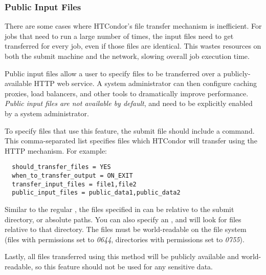 \subsubsection{\label{sec:public-input-files}Public Input Files}
There are some cases where HTCondor's file transfer mechanism is inefficient.
For jobs that need to run a large number of times, the input files need to get 
transferred for every job, even if those files are identical. This wastes 
resources on both the submit machine and the network, slowing overall job 
execution time.

Public input files allow a user to specify files to be transferred over a 
publicly-available HTTP web service. A system administrator can then configure
caching proxies, load balancers, and other tools to dramatically improve 
performance. \emph{Public input files are not available by default}, and need to 
be explicitly enabled by a system administrator.

To specify files that use this feature, the submit file should include a
 command. This comma-separated list specifies
files which HTCondor will transfer using the HTTP mechanism. For example:

\begin{verbatim}
  should_transfer_files = YES
  when_to_transfer_output = ON_EXIT
  transfer_input_files = file1,file2 
  public_input_files = public_data1,public_data2
\end{verbatim}

Similar to the regular , the files specified
in  can be relative to the submit directory,
or absolute paths. You can also specify an , and 
 will look for files relative to that directory. The files must
be world-readable on the file system (files with permissions set to \emph{0644},
directories with permissions set to \emph{0755}).

Lastly, all files transferred using this method will be publicly available and
world-readable, so this feature should not be used for any sensitive data.

